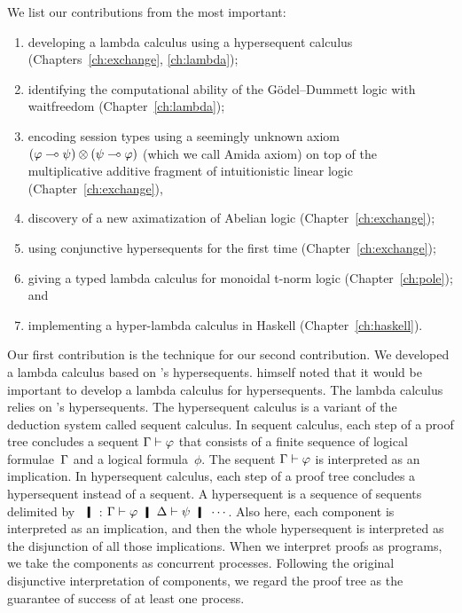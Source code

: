 We list our contributions from the most important:
\begin{enumerate}
 \item developing a lambda calculus using
       a hypersequent calculus (Chapters~\ref{ch:exchange}, \ref{ch:lambda});
 \item identifying the computational ability of the
       G\"odel--Dummett logic with waitfreedom (Chapter~\ref{ch:lambda});
 \item encoding session types using a seemingly unknown axiom
       $(\varphi\multimap \psi)\otimes(\psi\multimap \varphi)$ (which we call Amida axiom) on top
       of the multiplicative additive fragment of intuitionistic linear
       logic (Chapter~\ref{ch:exchange}),
 \item discovery of a new aximatization of Abelian logic (Chapter~\ref{ch:exchange});
 \item using conjunctive hypersequents for the first time
       (Chapter~\ref{ch:exchange});
 \item giving a typed lambda calculus for monoidal t-norm logic
       (Chapter~\ref{ch:pole}); and
 \item implementing a hyper-lambda calculus in Haskell (Chapter~\ref{ch:haskell}).
\end{enumerate}

Our first contribution is the technique for our second contribution.
We developed a lambda calculus based on \citet{avron91}'s hypersequents.
\citet{avron91} himself noted that it would be important to develop a
lambda calculus for hypersequents.
The lambda calculus relies on \citet{avron91}'s hypersequents.
The hypersequent calculus is a
variant of the deduction system called sequent calculus.  In sequent
calculus, each step of a proof tree concludes a sequent $\Gamma\vdash\varphi$ that
consists of a finite sequence of logical formulae~$\Gamma$ and a logical
formula~$\phi$.  The sequent $\Gamma\vdash\varphi$ is
interpreted as an implication.  In hypersequent calculus, each step of a
proof tree concludes a hypersequent instead of a sequent.  A
hypersequent is a sequence of sequents delimited by $\hmid$:
$\G\vdash\phi\hmid \D\vdash\psi
\hmid \cdots$.  Also here, each component is interpreted as an
implication, and then the whole hypersequent is interpreted as the
disjunction of all those implications.
When we interpret proofs as programs, we take the components as
concurrent processes.  Following the original disjunctive
interpretation of components, we regard the proof tree as the guarantee of
success of at least one process.

